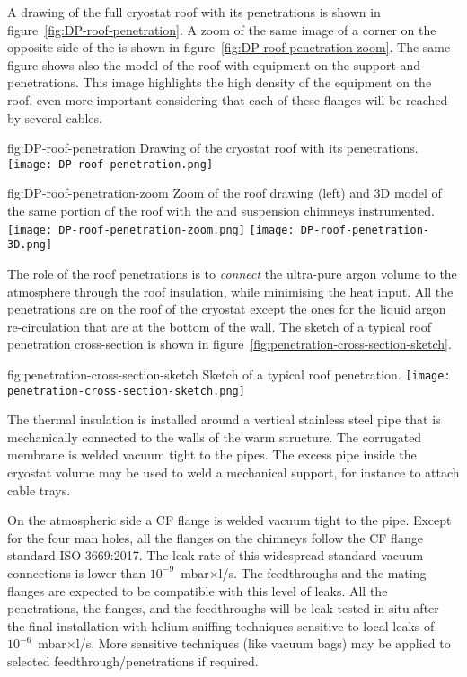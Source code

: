 A drawing of the full cryostat roof with its penetrations is shown in figure~\ref{fig:DP-roof-penetration}.
A zoom of the same image of a corner on the opposite side of the  is shown in figure~\ref{fig:DP-roof-penetration-zoom}.
The same figure shows also the \threed model of the roof with equipment on the  support and  penetrations.
This image highlights the high density of the equipment on the  roof, even more important considering that each of these flanges will be reached by several cables.

\begin{dunefigure}{fig:DP-roof-penetration}
{Drawing of the cryostat roof with its penetrations.}
\texttt{[image: DP-roof-penetration.png]}
\end{dunefigure}

\begin{dunefigure}{fig:DP-roof-penetration-zoom}
{Zoom of the  roof drawing (left) and 3D model of the same portion of the roof with the  and  suspension chimneys instrumented.}
\texttt{[image: DP-roof-penetration-zoom.png]}
\texttt{[image: DP-roof-penetration-3D.png]}
\end{dunefigure}

The role of the roof penetrations is to \emph{connect} the ultra-pure argon volume to the atmosphere through the roof insulation, while minimising the heat input.
All the penetrations are on the roof of the cryostat except the ones for the liquid argon re-circulation that are at the bottom of the  wall.
The sketch of a typical roof penetration cross-section is shown in figure~\ref{fig:penetration-cross-section-sketch}.
\begin{dunefigure}{fig:penetration-cross-section-sketch}
{Sketch of a typical roof penetration.}
\texttt{[image: penetration-cross-section-sketch.png]}
\end{dunefigure}
The thermal insulation is installed around a vertical stainless steel pipe that is mechanically connected to the walls of the warm structure.
The corrugated membrane is welded vacuum tight to the pipes.
The excess pipe inside the cryostat volume may be used to weld a mechanical support, for instance to attach cable trays.

On the atmospheric side a  CF flange is welded vacuum tight to the pipe.
Except for the four man holes, all the flanges on the chimneys follow the  CF flange standard ISO 3669:2017.
The leak rate of this widespread standard vacuum connections is lower than $10^{-9}$~mbar$\times$l/s.
The feedthroughs and the mating flanges are expected to be compatible with this level of leaks.
All the penetrations, the flanges, and the feedthroughs will be leak tested in situ after the final installation with helium sniffing techniques sensitive to local leaks of $10^{-6}$~mbar$\times$l/s.
More sensitive techniques (like vacuum bags) may be applied to selected feedthrough/penetrations if required.

